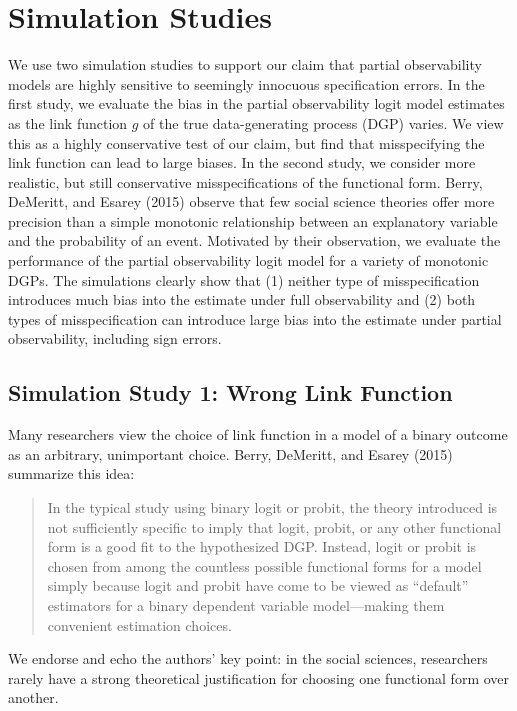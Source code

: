 \documentclass[10pt]{article}
\begin{document}
\section*{Simulation Studies}

We use two simulation studies to support our claim that partial observability models are highly sensitive to seemingly innocuous specification errors. 
In the first study, we evaluate the bias in the partial observability logit model estimates as the link function $g$ of the true data-generating process (DGP) varies. 
We view this as a highly conservative test of our claim, but find that misspecifying the link function can lead to large biases. 
In the second study, we consider more realistic, but still conservative misspecifications of the functional form. 
Berry, DeMeritt, and Esarey (2015) observe that few social science theories offer more precision than a simple monotonic relationship between an explanatory variable and the probability of an event. 
Motivated by their observation, we evaluate the performance of the partial observability logit model for a variety of monotonic DGPs.
The simulations clearly show that (1) neither type of misspecification introduces much bias into the estimate under full observability and (2) both types of misspecification can introduce large bias into the estimate under partial observability, including sign errors.

\subsection*{Simulation Study 1: Wrong Link Function}

Many researchers view the choice of link function in a model of a binary outcome as an arbitrary, unimportant choice. 
Berry, DeMeritt, and Esarey (2015) summarize this idea:
\begin{quote}
In the typical study using binary logit or probit, the theory introduced is not sufficiently specific to imply that logit, probit, or any other functional form is a good fit to the hypothesized DGP. 
Instead, logit or probit is chosen from among the countless possible functional forms for a model simply because logit and probit have come to be viewed as ``default'' estimators for a binary dependent variable model---making them convenient estimation choices.
\end{quote}
We endorse and echo the authors' key point: in the social sciences, researchers rarely have a strong theoretical justification for choosing one functional form over another. 
\end{document}
